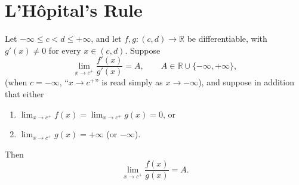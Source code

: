 \documentclass{essay}
\begin{document}
\section{L'H\^opital's Rule}

\begin{theorem}[L'H\^opital]
  Let $-\infty \le c < d \le +\infty$, and let $f,g:(c,d)\to\mathbb{R}$ be differentiable, with $g'(x)\neq 0$ for every $x\in(c,d)$. Suppose
  \[
    \lim_{x\to c^+} \frac{f'(x)}{g'(x)} = A, \qquad A\in\mathbb{R}\cup\{-\infty,+\infty\},
  \]
  (when $c=-\infty$, ``$x\to c^+$'' is read simply as $x\to-\infty$), and suppose in addition that either
  \begin{enumerate}
    \item[(a)] $\displaystyle \lim_{x\to c^+} f(x) = \lim_{x\to c^+} g(x) = 0$, \quad or
    \item[(b)] $\displaystyle \lim_{x\to c^+} g(x) = +\infty$ \; (or $-\infty$).
  \end{enumerate}
  Then
  \[
    \lim_{x\to c^+} \frac{f(x)}{g(x)} = A.
  \]
\end{theorem}
\end{document}
